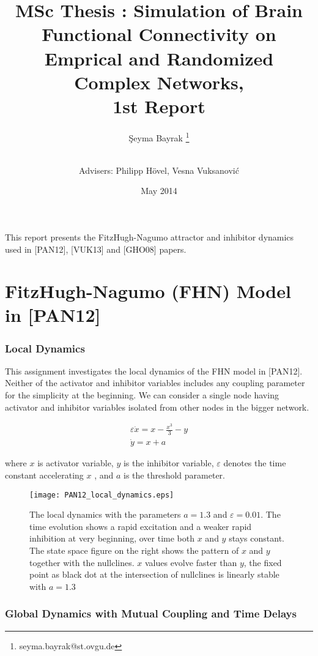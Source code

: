 \documentclass[12pt]{article}
\title{MSc Thesis : Simulation of Brain Functional Connectivity on Emprical and Randomized Complex Networks, \\ 1st Report}
\author[1]{\c{S}eyma Bayrak \thanks{seyma.bayrak@st.ovgu.de}}
\author[ ]{\\ Advisers: Philipp H\"{o}vel, Vesna Vuksanovi\'c}
\affil[1]{\footnotesize{Integrative Neuroscience MSc, Otto von Guericke University, Magdeburg}}
\date{May 2014}
\begin{document}
   \maketitle
   
This report presents the FitzHugh-Nagumo attractor and inhibitor dynamics used in [PAN12], [VUK13] and [GHO08] papers. 

\section{FitzHugh-Nagumo (FHN) Model in [PAN12]} 

\subsubsection{Local Dynamics}

This assignment investigates the local dynamics of the FHN model in [PAN12]. Neither of the activator and inhibitor variables includes any coupling parameter for the simplicity at the beginning. We can consider a single node having activator and inhibitor variables isolated from other nodes in the bigger network. 
   
\begin{subequations} \begin{align} \varepsilon  \dot{x} = x - \frac{x^3}{3} -y   \label{eqn: frobenius 6}\\  \dot{y} = x+a \label{eqn: frobenius 7}   \end{align} 
\end{subequations}

where $x$ is activator variable, $y$ is the inhibitor variable, $\varepsilon$ denotes the time constant accelerating $x$ , and $a$ is the threshold parameter. 


\begin{figure}[h!]
	\centering
	\texttt{[image: PAN12\_local\_dynamics.eps]}
	\caption{The local dynamics with the parameters $a=1.3$ and $\varepsilon = 0.01$. The time evolution shows a rapid excitation and a weaker rapid inhibition at very beginning, over time both $x$ and $y$ stays constant. The state space figure on the right shows the pattern of $x$ and $y$ together with the nullclines. $x$ values evolve faster than $y$, the fixed point as black dot at the intersection of nullclines is linearly stable with $a=1.3$}
\end{figure}

\newpage

\subsubsection{Global Dynamics with Mutual Coupling and Time Delays}
\end{document}
